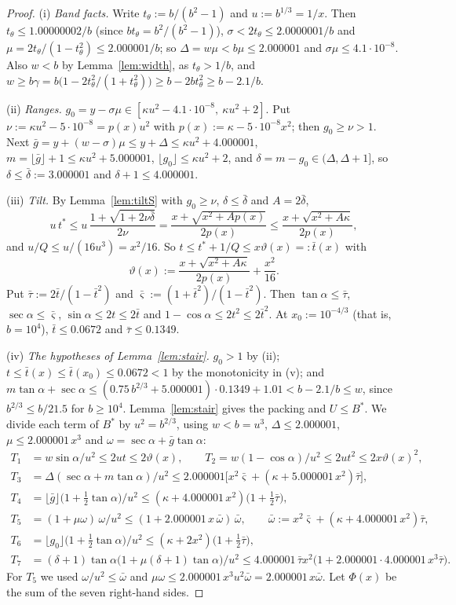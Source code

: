 \documentclass[11pt]{amsart}
\newcommand{\ca}{\cos\alpha}
\newcommand{\sa}{\sin\alpha}
\newcommand{\ta}{\tan\alpha}
\newcommand{\se}{\sec\alpha}
\theoremstyle{definition}
\theoremstyle{remark}
\numberwithin{equation}{section}
\begin{document}
\begin{proof}
(i) \emph{Band facts.} Write $t_\theta:=b/(b^2-1)$ and $u:=b^{1/3}=1/x$. Then $t_\theta\le1.00000002/b$ (since
$bt_\theta=b^2/(b^2-1)$), $\sigma<2t_\theta\le2.0000001/b$ and $\mu=2t_\theta/(1-t_\theta^2)\le2.000001/b$; so
$\Delta=w\mu<b\mu\le2.000001$ and $\sigma\mu\le4.1\cdot10^{-8}$. Also $w<b$ by Lemma~\ref{lem:width}, as $t_\theta>1/b$,
and $w\ge b\gamma=b\bigl(1-2t_\theta^2/(1+t_\theta^2)\bigr)\ge b-2bt_\theta^2\ge b-2.1/b$.

(ii) \emph{Ranges.} $g_0=y-\sigma\mu\in[\kappa u^2-4.1\cdot10^{-8},\ \kappa u^2+2]$. Put
$\nu:=\kappa u^2-5\cdot10^{-8}=p(x)u^2$ with $p(x):=\kappa-5\cdot10^{-8}x^2$; then $g_0\ge\nu>1$. Next
$\bar g=y+(w-\sigma)\mu\le y+\Delta\le\kappa u^2+4.000001$, $m=\lfloor\bar g\rfloor+1\le\kappa u^2+5.000001$,
$\lfloor g_0\rfloor\le\kappa u^2+2$, and $\delta=m-g_0\in(\Delta,\Delta+1]$, so $\delta\le\bar\delta:=3.000001$ and
$\delta+1\le4.000001$.

(iii) \emph{Tilt.} By Lemma~\ref{lem:tiltS} with $g_0\ge\nu$, $\delta\le\bar\delta$ and $A=2\bar\delta$,
\[
u\,t^*\le u\,\frac{1+\sqrt{1+2\nu\bar\delta}}{2\nu}=\frac{x+\sqrt{x^2+Ap(x)}}{2p(x)}\le\frac{x+\sqrt{x^2+A\kappa}}{2p(x)},
\]
and $u/Q\le u/(16u^3)=x^2/16$. So $t\le t^*+1/Q\le x\vartheta(x)=:\bar t(x)$ with
\[
\vartheta(x):=\frac{x+\sqrt{x^2+A\kappa}}{2p(x)}+\frac{x^2}{16}.
\]
Put $\bar\tau:=2\bar t/(1-\bar t^2)$ and $\bar\varsigma:=(1+\bar t^2)/(1-\bar t^2)$. Then $\ta\le\bar\tau$,
$\se\le\bar\varsigma$, $\sa\le2t\le2\bar t$ and $1-\ca\le2t^2\le2\bar t^2$. At $x_0:=10^{-4/3}$ (that is, $b=10^4$),
$\bar t\le0.0672$ and $\bar\tau\le0.1349$.

(iv) \emph{The hypotheses of Lemma~\ref{lem:stair}.} $g_0>1$ by (ii); $t\le\bar t(x)\le\bar t(x_0)\le0.0672<1$ by the
monotonicity in (v); and $m\ta+\se\le(0.75\,b^{2/3}+5.000001)\cdot0.1349+1.01<b-2.1/b\le w$, since $b^{2/3}\le b/21.5$
for $b\ge10^4$. Lemma~\ref{lem:stair} gives the packing and $U\le B^*$. We divide each term of $B^*$ by $u^2=b^{2/3}$,
using $w<b=u^3$, $\Delta\le2.000001$, $\mu\le2.000001\,x^3$ and $\omega=\se+\bar g\ta$:
\begin{align*}
T_1&=w\sa/u^2\le2ut\le2\vartheta(x),\qquad T_2=w(1-\ca)/u^2\le2ut^2\le2x\vartheta(x)^2,\\
T_3&=\Delta(\se+m\ta)/u^2\le2.000001\bigl[x^2\bar\varsigma+(\kappa+5.000001\,x^2)\bar\tau\bigr],\\
T_4&=\lfloor\bar g\rfloor\bigl(1+\tfrac12\ta\bigr)/u^2\le(\kappa+4.000001\,x^2)\bigl(1+\tfrac12\bar\tau\bigr),\\
T_5&=(1+\mu\omega)\,\omega/u^2\le(1+2.000001\,x\,\bar\omega)\,\bar\omega,\qquad
\bar\omega:=x^2\bar\varsigma+(\kappa+4.000001\,x^2)\bar\tau,\\
T_6&=\lfloor g_0\rfloor\bigl(1+\tfrac12\ta\bigr)/u^2\le(\kappa+2x^2)\bigl(1+\tfrac12\bar\tau\bigr),\\
T_7&=(\delta+1)\ta\bigl(1+\mu(\delta+1)\ta\bigr)/u^2\le4.000001\,\bar\tau x^2\bigl(1+2.000001\cdot4.000001\,x^3\bar\tau\bigr).
\end{align*}
For $T_5$ we used $\omega/u^2\le\bar\omega$ and $\mu\omega\le2.000001\,x^3u^2\bar\omega=2.000001\,x\bar\omega$. Let
$\Phi(x)$ be the sum of the seven right-hand sides.


\end{proof}
\end{document}
